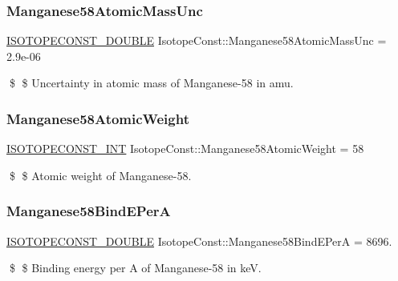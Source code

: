 \subsubsection{\texorpdfstring{Manganese58\+Atomic\+Mass\+Unc}{Manganese58AtomicMassUnc}}
{\footnotesize\ttfamily \mbox{\hyperlink{group___isotope_const-_macros_ga8f45a7272ce02c0b4c65c44636ed719a}{I\+S\+O\+T\+O\+P\+E\+C\+O\+N\+S\+T\+\_\+\+D\+O\+U\+B\+LE}} Isotope\+Const\+::\+Manganese58\+Atomic\+Mass\+Unc = 2.\+9e-\/06}

\$ \$ Uncertainty in atomic mass of Manganese-\/58 in amu. \mbox{\label{group___isotope_const-_manganese-_mn58_ga1a77e9a6189daf81aba33915523fa825}} 
\subsubsection{\texorpdfstring{Manganese58\+Atomic\+Weight}{Manganese58AtomicWeight}}
{\footnotesize\ttfamily \mbox{\hyperlink{group___isotope_const-_macros_ga5f18360b3e99483a35c32d789e62621c}{I\+S\+O\+T\+O\+P\+E\+C\+O\+N\+S\+T\+\_\+\+I\+NT}} Isotope\+Const\+::\+Manganese58\+Atomic\+Weight = 58}

\$ \$ Atomic weight of Manganese-\/58. \mbox{\label{group___isotope_const-_manganese-_mn58_ga1ad59cf24473b919af2f3d96004bf07b}} 
\subsubsection{\texorpdfstring{Manganese58\+Bind\+E\+PerA}{Manganese58BindEPerA}}
{\footnotesize\ttfamily \mbox{\hyperlink{group___isotope_const-_macros_ga8f45a7272ce02c0b4c65c44636ed719a}{I\+S\+O\+T\+O\+P\+E\+C\+O\+N\+S\+T\+\_\+\+D\+O\+U\+B\+LE}} Isotope\+Const\+::\+Manganese58\+Bind\+E\+PerA = 8696.}

\$ \$ Binding energy per A of Manganese-\/58 in keV. \mbox{\label{group___isotope_const-_manganese-_mn58_gae5463b46718444190d2ad02615420e73}} 
